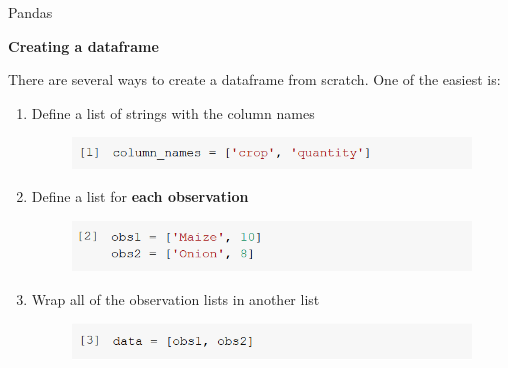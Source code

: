 \documentclass[aspectratio=169]{beamer}
\begin{document}
\begin{frame}{Pandas}

	\textbf{Creating a dataframe}

	There are several ways to create a dataframe from scratch. One of the easiest is:

	\begin{enumerate}
		\item Define a list of strings with the column names
		\begin{figure}
			\includegraphics[width=0.8\linewidth]{img/column_names.png}
		\end{figure}
		\item Define a list for \textbf{each observation}
		\begin{figure}
			\includegraphics[width=0.8\linewidth]{img/observation_lists.png}
		\end{figure}
		\item Wrap all of the observation lists in another list
		\begin{figure}
			\includegraphics[width=0.8\linewidth]{img/data_list.png}
		\end{figure}
	\end{enumerate}

\end{frame}
\end{document}
